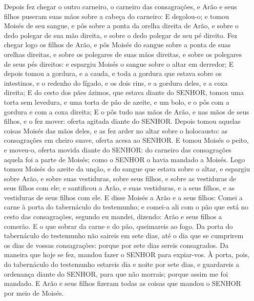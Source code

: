 {Depois fez chegar o outro carneiro, o carneiro das consagrações, e Arão e seus filhos puseram suas mãos sobre a cabeça do carneiro:
E degolou-o; e tomou Moisés de seu sangue, e pôs sobre a ponta da orelha direita de Arão, e sobre o dedo polegar de sua mão direita, e sobre o dedo polegar de seu pé direito.
Fez chegar logo os filhos de Arão, e pôs Moisés do sangue sobre a ponta de suas orelhas direitas, e sobre os polegares de suas mãos direitas, e sobre os polegares de seus pés direitos: e espargiu Moisés o sangue sobre o altar em derredor;
E depois tomou a gordura, e a cauda, e toda a gordura que estava sobre os intestinos, e o redenho do fígado, e os dois rins, e a gordura deles, e a coxa direita;
E do cesto dos pães ázimos, que estava diante do SENHOR, tomou uma torta sem levedura, e uma torta de pão de azeite, e um bolo, e o pôs com a gordura e com a coxa direita;
E o pôs tudo nas mãos de Arão, e nas mãos de seus filhos, e o fez mover: oferta agitada diante do SENHOR.
Depois tomou aquelas coisas Moisés das mãos deles, e as fez arder no altar sobre o holocausto: as consagrações em cheiro suave, oferta acesa ao SENHOR.
E tomou Moisés o peito, e moveu-o, oferta movida diante do SENHOR: do carneiro das consagrações aquela foi a parte de Moisés; como o SENHOR o havia mandado a Moisés.
Logo tomou Moisés do azeite da unção, e do sangue que estava sobre o altar, e espargiu sobre Arão, e sobre suas vestiduras, sobre seus filhos, e sobre as vestiduras de seus filhos com ele; e santificou a Arão, e suas vestiduras, e a seus filhos, e as vestiduras de seus filhos com ele.
E disse Moisés a Arão e a seus filhos: Comei a carne à porta do tabernáculo do testemunho; e comei-a ali com o pão que está no cesto das consagrações, segundo eu mandei, dizendo: Arão e seus filhos a comerão.
E o que sobrar da carne e do pão, queimareis ao fogo.
Da porta do tabernáculo do testemunho não saireis em sete dias, até o dia que se cumprirem os dias de vossas consagrações: porque por sete dias sereis consagrados.
Da maneira que hoje se fez, mandou fazer o SENHOR para expiar-vos.
À porta, pois, do tabernáculo do testemunho estareis dia e noite por sete dias, e guardareis a ordenança diante do SENHOR, para que não morrais; porque assim me foi mandado.
E Arão e seus filhos fizeram todas as coisas que mandou o SENHOR por meio de Moisés.

}
